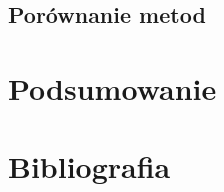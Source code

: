 \documentclass[a4paper,12pt]{article}
\begin{document}
\subsection{Porównanie metod}

\section{Podsumowanie}

\section{Bibliografia}
\end{document}
